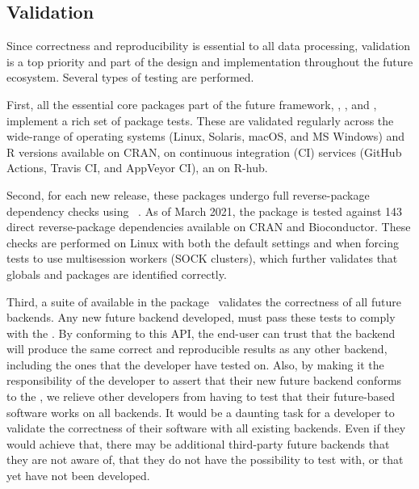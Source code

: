 \subsection{Validation}
\label{validation}

Since correctness and reproducibility is essential to all data
processing, validation is a top priority and part of the design and
implementation throughout the future ecosystem.  Several types of
testing are performed.

First, all the essential core packages part of the future framework,
, , and ,
implement a rich set of package tests.  These are validated regularly
across the wide-range of operating systems (Linux, Solaris, macOS, and
MS Windows) and R versions available on CRAN, on continuous
integration (CI) services (GitHub Actions, Travis CI, and AppVeyor
CI), an on R-hub.

Second, for each new release, these packages undergo full
reverse-package dependency checks
using ~\citep{GitHub:revdepcheck}.  As of March 2021,
the  package is tested against 143 direct reverse-package
dependencies available on CRAN and Bioconductor.  These checks are
performed on Linux with both the default settings and when forcing
tests to use multisession workers (SOCK clusters), which further
validates that globals and packages are identified correctly.

Third, a suite of  available in the
 package~\citep{CRAN:future.tests} validates the
correctness of all future backends.  Any new future backend developed,
must pass these tests to comply with the .  By
conforming to this API, the end-user can trust that the backend will
produce the same correct and reproducible results as any other
backend, including the ones that the developer have tested on.  Also,
by making it the responsibility of the developer to assert that their
new future backend conforms to the , we relieve other
developers from having to test that their future-based software works
on all backends.  It would be a daunting task for a developer to
validate the correctness of their software with all existing
backends. Even if they would achieve that, there may be additional
third-party future backends that they are not aware of, that they do
not have the possibility to test with, or that yet have not been
developed.


